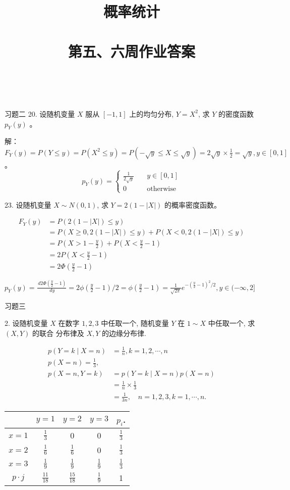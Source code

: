 \documentclass[14pt]{scrartcl} %
\title{	
	\normalfont \huge
	\textsc{概率统计} \\ [25pt] %
	\horrule{0.5pt} \\[0.4cm] %
	\huge 第五、六周作业答案 \\ %
	\horrule{0.5pt} \\[0.4cm] %
	\date{}
}
\numberwithin{equation}{section} %
\numberwithin{figure}{section} %
\numberwithin{table}{section} %
\begin{document}
	\maketitle %
	习题二
	20. 设随机变量 $X$ 服从 $[-1,1]$ 上的均匀分布, $Y=X^{2}$, 求 $Y$ 的密度函数 $p_{Y}(y)$ 。
	
	\vspace*{1cm}
	解：
	$F_Y(y) = P(Y \leq y) = P(X ^ 2 \leq y) = P(-\sqrt{y} \leq X \leq \sqrt{y}) = 2 \sqrt{y} \times \frac{1}{2} = \sqrt{y}, y \in [0, 1]$。
	\[
	p_Y(y) = \left\{
	\begin{array}{cl}
		\frac{1}{2\sqrt{y}} & \quad y \in [0, 1] \\
		0 & \quad \text{otherwise}
	\end{array}
	\right.
	\]
	
	23. 设随机变量 $X \sim N(0,1)$, 求 $Y=2(1-|X|)$ 的概率密度函数。
	
	\vspace*{1cm}
	\begin{align}
		F_Y(y) & = P(2(1 - |X|) \leq y) \\
		& = P( X \geq 0, 2(1 - |X|) \leq y) + P( X < 0, 2(1 - |X|) \leq y) \\
		& = P(X > 1 - \frac{y}{2}) + P(X < \frac{y}{2} - 1) \\
		& = 2P(X < \frac{y}{2} - 1) \\
		& = 2 \Phi(\frac{y}{2} - 1)
	\end{align}
	
	$p_Y(y) = \frac{\,d2\Phi(\frac{y}{2} - 1)}{\,dy} = 2 \phi(\frac{y}{2} - 1) / 2 = \phi(\frac{y}{2} - 1) = \frac{1}{\sqrt{2\pi}}e ^ {-(\frac{y}{2} - 1) ^ 2 / 2}, y \in (-\infty, 2]$
	
	习题三
	
	2. 设随机变量 $X$ 在数字 $1,2,3$ 中任取一个, 随机变量 $Y$ 在 $1 \sim X$ 中任取一个, 求 $(X, Y)$ 的联合 分布律及 $X, Y$ 的边缘分布律.
	
	$$
	\begin{aligned}
		p(Y=k \mid X=n) & =\frac{1}{n}, k=1,2, \cdots, n \\
		p(X=n)=\frac{1}{3}, & \\
		p(X=n, Y=k) & =p(Y=k \mid X=n) p(X=n) \\
		& =\frac{1}{n} \times \frac{1}{3} \\
		& =\frac{1}{3 n}, \quad n=1,2,3, k=1, \cdots, n .
	\end{aligned}
	$$
	\begin{center}
		\begin{tabular}{c|c|c|c|c}
			& $y=1$ & $y=2$ & $y=3$ & $p_{i}$. \\
			\hline
			$x=1$ & $\frac{1}{3}$ & 0 & 0 & $\frac{1}{3}$ \\
			\hline
			$x=2$ & $\frac{1}{6}$ & $\frac{1}{6}$ & 0 & $\frac{1}{3}$ \\
			\hline
			$x=3$ & $\frac{1}{9}$ & $\frac{1}{9}$ & $\frac{1}{9}$ & $\frac{1}{3}$ \\
			\hline
			$p \cdot j$ & $\frac{11}{18}$ & $\frac{15}{18}$ & $\frac{1}{9}$ & 1 \\
			\hline
		\end{tabular}
	\end{center}
	
\end{document}
